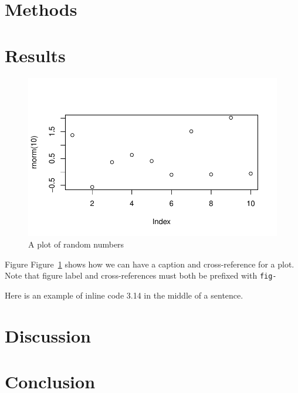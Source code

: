 \documentclass[
  number]{elsarticle}
\begin{document}
\hypertarget{methods}{%
\section{Methods}\label{methods}}

\hypertarget{results}{%
\section{Results}\label{results}}

\begin{figure}

{\centering \includegraphics{paper_files/figure-pdf/fig-demo-plot-1.pdf}

}

\caption{\label{fig-demo-plot}A plot of random numbers}

\end{figure}

Figure Figure~\ref{fig-demo-plot} shows how we can have a caption and
cross-reference for a plot. Note that figure label and cross-references
must both be prefixed with \texttt{fig-}

Here is an example of inline code 3.14 in the middle of a sentence.

\hypertarget{discussion}{%
\section{Discussion}\label{discussion}}

\hypertarget{conclusion}{%
\section{Conclusion}\label{conclusion}}
\end{document}
